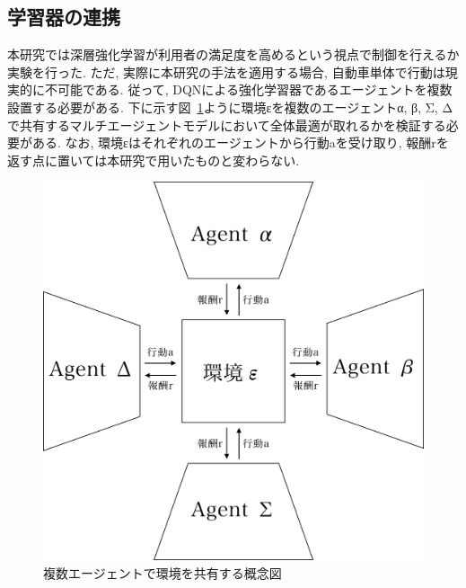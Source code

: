 \subsection{学習器の連携}

本研究では深層強化学習が利用者の満足度を高めるという視点で制御を行えるか実験を行った.
ただ, 実際に本研究の手法を適用する場合, 自動車単体で行動は現実的に不可能である.
従って, DQNによる強化学習器であるエージェントを複数設置する必要がある. 下に示す図~\ref{integrated_dqn}ように環境εを複数のエージェントα, β, Σ, Δ
で共有するマルチエージェントモデルにおいて全体最適が取れるかを検証する必要がある.
なお, 環境εはそれぞれのエージェントから行動aを受け取り, 報酬rを返す点に置いては本研究で用いたものと変わらない.



\begin{figure}[H]
    \centering
    \includegraphics[clip,width = 12.0cm]{assets/multiagent_shared_env.eps}
    \caption{複数エージェントで環境を共有する概念図}  \label{integrated_dqn}
\end{figure}

